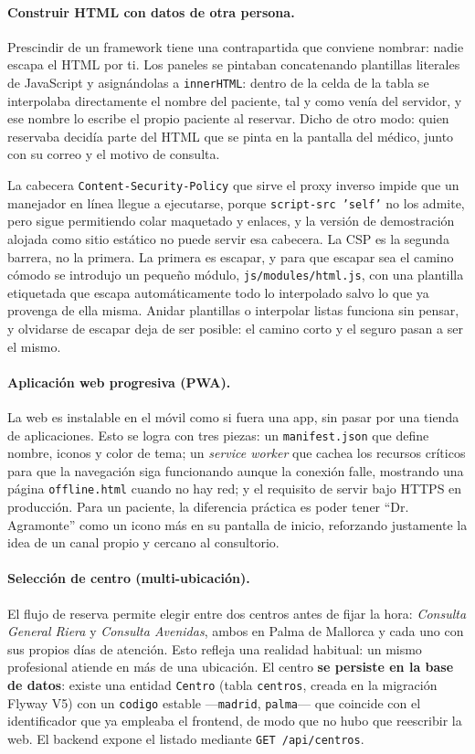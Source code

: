 \documentclass[12pt,a4paper]{report}
\begin{document}
\paragraph{Construir HTML con datos de otra persona.} Prescindir de un framework tiene una contrapartida que conviene nombrar: nadie escapa el HTML por ti. Los paneles se pintaban concatenando plantillas literales de JavaScript y asignándolas a \texttt{innerHTML}: dentro de la celda de la tabla se interpolaba directamente el nombre del paciente, tal y como venía del servidor, y ese nombre lo escribe el propio paciente al reservar. Dicho de otro modo: quien reservaba decidía parte del HTML que se pinta en la pantalla del médico, junto con su correo y el motivo de consulta.

La cabecera \texttt{Content-Security-Policy} que sirve el proxy inverso impide que un manejador en línea llegue a ejecutarse, porque \texttt{script-src 'self'} no los admite, pero sigue permitiendo colar maquetado y enlaces, y la versión de demostración alojada como sitio estático no puede servir esa cabecera. La CSP es la segunda barrera, no la primera. La primera es escapar, y para que escapar sea el camino cómodo se introdujo un pequeño módulo, \texttt{js/modules/html.js}, con una plantilla etiquetada que escapa automáticamente todo lo interpolado salvo lo que ya provenga de ella misma. Anidar plantillas o interpolar listas funciona sin pensar, y olvidarse de escapar deja de ser posible: el camino corto y el seguro pasan a ser el mismo.

\paragraph{Aplicación web progresiva (PWA).} La web es instalable en el móvil como si fuera una app, sin pasar por una tienda de aplicaciones. Esto se logra con tres piezas: un \texttt{manifest.json} que define nombre, iconos y color de tema; un \emph{service worker} que cachea los recursos críticos para que la navegación siga funcionando aunque la conexión falle, mostrando una página \texttt{offline.html} cuando no hay red; y el requisito de servir bajo HTTPS en producción. Para un paciente, la diferencia práctica es poder tener ``Dr. Agramonte'' como un icono más en su pantalla de inicio, reforzando justamente la idea de un canal propio y cercano al consultorio.

\paragraph{Selección de centro (multi-ubicación).} El flujo de reserva permite elegir entre dos centros antes de fijar la hora: \emph{Consulta General Riera} y \emph{Consulta Avenidas}, ambos en Palma de Mallorca y cada uno con sus propios días de atención. Esto refleja una realidad habitual: un mismo profesional atiende en más de una ubicación. El centro \textbf{se persiste en la base de datos}: existe una entidad \texttt{Centro} (tabla \texttt{centros}, creada en la migración Flyway V5) con un \texttt{codigo} estable —\texttt{madrid}, \texttt{palma}— que coincide con el identificador que ya empleaba el frontend, de modo que no hubo que reescribir la web. El backend expone el listado mediante \texttt{GET /api/centros}.
\end{document}
